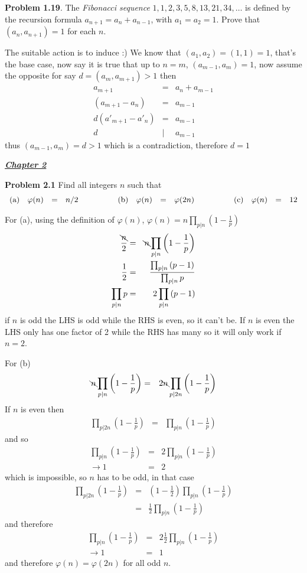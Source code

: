 \documentclass[aps,preprint,preprintnumbers,nofootinbib,showpacs,prd]{revtex4-1}
\newcommand{\nbea}{\begin{eqnarray*}}
\newcommand{\neea}{\end{eqnarray*}}
\begin{document}
{\bf Problem 1.19}. The {\it Fibonacci sequence} $1,1,2,3,5,8,13,21,34,\dots$ is defined by the recursion formula $a_{n+1} = a_n + a_{n-1}$, with $a_1 = a_2 = 1$. Prove that $(a_n,a_{n+1})=1$ for each $n$.

The suitable action is to induce :) We know that $(a_1,a_2) = (1,1) = 1$, that's the base case, now say it is true that up to $n = m$, $(a_{m-1},a_m)=1$, now assume the opposite for say $d = (a_m,a_{m+1}) > 1$ then
%
\nbea
a_{m+1} & = & a_n + a_{m-1} \\
(a_{m+1} - a_n) & = &  a_{m-1} \\
d(a'_{m+1} - a'_n) & = &  a_{m-1} \\
d &|& a_{m-1}
\neea
%
thus $(a_{m-1},a_m) = d > 1$ which is a contradiction, therefore $d=1$


\bigskip
\underline{\textbf{\textit{Chapter 2}}}
\bigskip

{\bf Problem 2.1} Find all integers $n$ such that
%
\nbea
\begin{array}{l r c l c l r c l c l r c l}
{\rm(a)} & \varphi(n) & = & n/2 & ~~~~~~~~~ & {\rm(b)} & \varphi(n) & = & \varphi(2n) & ~~~~~~~~~ & {\rm(c)} & \varphi(n) & = & 12
\end{array}
\neea
%

For (a), using the definition of $\varphi(n)$, $\varphi(n) = n \prod_{p|n} \left ( 1 - \frac{1}{p} \right )$
%
\nbea
\frac{\bcancel{n}}{2} & = & \bcancel{n} \prod_{p|n} \left ( 1 - \frac{1}{p} \right ) \\
\frac{1}{2} & = & \frac{\prod_{p|n} \left ( p - 1 \right )}{\prod_{p|n} p} \\
\prod_{p|n} p & = & 2\prod_{p|n} \left ( p - 1 \right )
\neea
%
if $n$ is odd the LHS is odd while the RHS is even, so it can't be. If $n$ is even the LHS only has one factor of 2 while the RHS has many so it will only work if $n=2$.

For (b)
%
\nbea
\bcancel{n} \prod_{p|n} \left ( 1 - \frac{1}{p} \right )  & = & 2\bcancel{n} \prod_{p|2n} \left ( 1 - \frac{1}{p} \right )
\neea
%
If $n$ is even then
%
\nbea
\prod_{p|2n} \left ( 1 - \frac{1}{p} \right ) & = & \prod_{p|n} \left ( 1 - \frac{1}{p} \right )
\neea
%
and so
%
\nbea
\prod_{p|n} \left ( 1 - \frac{1}{p} \right )  & = & 2\prod_{p|n} \left ( 1 - \frac{1}{p} \right ) \\
\to 1 & = & 2
\neea
%
which is impossible, so $n$ has to be odd, in that case
%
\nbea
\prod_{p|2n} \left ( 1 - \frac{1}{p} \right ) & = & \left ( 1 - \frac{1}{2} \right ) \prod_{p|n} \left ( 1 - \frac{1}{p} \right ) \\
& = & \frac{1}{2} \prod_{p|n} \left ( 1 - \frac{1}{p} \right )
\neea
%
and therefore
%
\nbea
\prod_{p|n} \left ( 1 - \frac{1}{p} \right )  & = & 2 \frac{1}{2} \prod_{p|n} \left ( 1 - \frac{1}{p} \right ) \\
\to 1 & = & 1
\neea
%
and therefore $\varphi(n) = \varphi(2n)$ for all odd $n$.
\end{document}

